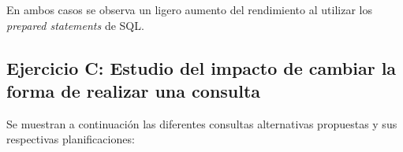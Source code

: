 \documentclass{article}
\begin{document}
\begin{multicols}{4}
    \begin{center}
    \end{center}
    \columnbreak
    \begin{center}
    \end{center}
    \columnbreak
    \begin{center}
    \end{center}
    \columnbreak
    \begin{center}
    \end{center}
\end{multicols}
En ambos casos se observa un ligero aumento del rendimiento al utilizar los \textit{prepared statements} de SQL.
\newpage
\subsection{Ejercicio C: {\small Estudio del impacto de cambiar la forma de realizar una consulta}}
Se muestran a continuación las diferentes consultas alternativas propuestas y sus respectivas planificaciones:
\end{document}
